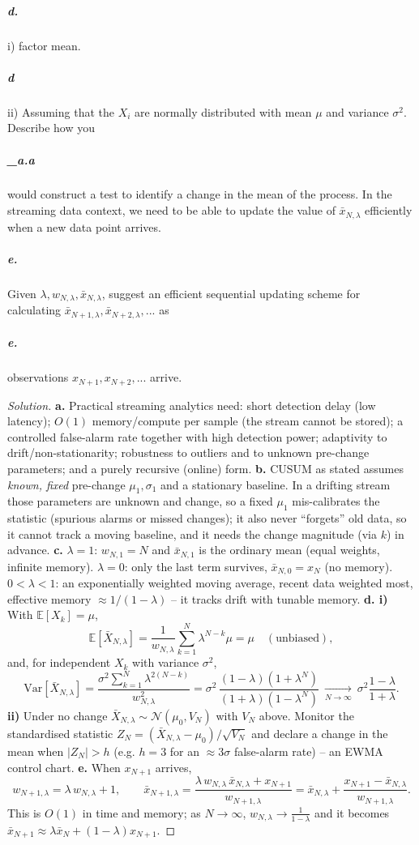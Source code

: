\documentclass[11pt]{article}
\newcommand{\pnewline}[1]{\vspace*{-\baselineskip}\subparagraph*{{\color{white} #1}}}
\newcommand{\skipnewline}{\vspace*{-\baselineskip}}
\newcommand{\newnew}{\newline\newline}
\newenvironment{solution}
  {\renewcommand\qedsymbol{$\blacksquare$}\begin{proof}[Solution]}
  {\end{proof}}
\begin{document}
\subparagraph*{\color{white} d.}{\color{white} i)} factor mean.\skipnewline
\subparagraph*{\color{white} d} ii) Assuming that the $X_i$ are normally distributed with mean $\mu$ and variance $\sigma^2$. Describe how you \pnewline{\_a.a}would construct a test to identify a change in the mean of the process. \newnew
In the streaming data context, we need to be able to update the value of $\bar{x}_{N,\lambda}$ efficiently when a new data point arrives.
\subparagraph*{e.} Given $\lambda, w_{N,\lambda}, \bar{x}_{N, \lambda}$, suggest an efficient sequential updating scheme for calculating $\bar{x}_{N+1,\lambda}, \bar{x}_{N+2,\lambda}, ... $ as \skipnewline\pnewline{e.}observations $x_{N+1}, x_{N+2}, ...$ arrive.
\begin{solution}
\textbf{a.} Practical streaming analytics need: short detection delay (low latency); $O(1)$ memory/compute per sample (the stream cannot be stored); a controlled false-alarm rate together with high detection power; adaptivity to drift/non-stationarity; robustness to outliers and to unknown pre-change parameters; and a purely recursive (online) form.
\newline
\textbf{b.} CUSUM as stated assumes \emph{known, fixed} pre-change $\mu_1,\sigma_1$ and a stationary baseline. In a drifting stream those parameters are unknown and change, so a fixed $\mu_1$ mis-calibrates the statistic (spurious alarms or missed changes); it also never ``forgets'' old data, so it cannot track a moving baseline, and it needs the change magnitude (via $k$) in advance.
\newline
\textbf{c.} $\lambda=1$: $w_{N,1}=N$ and $\bar x_{N,1}$ is the ordinary mean (equal weights, infinite memory). $\lambda=0$: only the last term survives, $\bar x_{N,0}=x_N$ (no memory). $0<\lambda<1$: an exponentially weighted moving average, recent data weighted most, effective memory $\approx 1/(1-\lambda)$ -- it tracks drift with tunable memory.
\newline
\textbf{d. i)} With $\mathds{E}[X_k]=\mu$,
$$\mathds{E}[\bar X_{N,\lambda}]=\frac{1}{w_{N,\lambda}}\sum_{k=1}^N\lambda^{N-k}\mu=\mu\quad(\text{unbiased}),$$
and, for independent $X_k$ with variance $\sigma^2$,
$$\mathrm{Var}[\bar X_{N,\lambda}]=\frac{\sigma^2\sum_{k=1}^N\lambda^{2(N-k)}}{w_{N,\lambda}^2}=\sigma^2\,\frac{(1-\lambda)(1+\lambda^{N})}{(1+\lambda)(1-\lambda^{N})}\ \xrightarrow[N\to\infty]{}\ \sigma^2\frac{1-\lambda}{1+\lambda}.$$
\textbf{ii)} Under no change $\bar X_{N,\lambda}\sim\mathcal N(\mu_0,V_N)$ with $V_N$ above. Monitor the standardised statistic $Z_N=(\bar X_{N,\lambda}-\mu_0)/\sqrt{V_N}$ and declare a change in the mean when $|Z_N|>h$ (e.g. $h=3$ for an $\approx3\sigma$ false-alarm rate) -- an EWMA control chart.
\newline
\textbf{e.} When $x_{N+1}$ arrives,
$$w_{N+1,\lambda}=\lambda\,w_{N,\lambda}+1,\qquad \bar x_{N+1,\lambda}=\frac{\lambda\,w_{N,\lambda}\,\bar x_{N,\lambda}+x_{N+1}}{w_{N+1,\lambda}}=\bar x_{N,\lambda}+\frac{x_{N+1}-\bar x_{N,\lambda}}{w_{N+1,\lambda}}.$$
This is $O(1)$ in time and memory; as $N\to\infty$, $w_{N,\lambda}\to\frac{1}{1-\lambda}$ and it becomes $\bar x_{N+1}\approx\lambda\bar x_N+(1-\lambda)x_{N+1}$. 
\end{solution}
\end{document}
